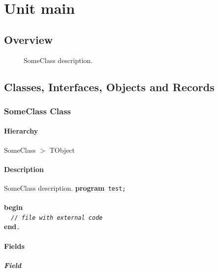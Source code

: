 \documentclass{report}
\begin{document}
\newlength{\tmplength}
\chapter{Unit main}
\section{Overview}
\begin{description}
\item[\texttt{\begin{ttfamily}SomeClass\end{ttfamily} Class}]SomeClass description.
\end{description}
\section{Classes, Interfaces, Objects and Records}
\subsection*{SomeClass Class}
\subsubsection*{\large{\textbf{Hierarchy}}\normalsize\hspace{1ex}\hfill}
SomeClass {$>$} TObject
\subsubsection*{\large{\textbf{Description}}\normalsize\hspace{1ex}\hfill}
SomeClass description. \texttt{}\textbf{program}\texttt{~test;\\\nopagebreak[3]
\\\nopagebreak[3]
}\textbf{begin}\texttt{\\\nopagebreak[3]
~~\textit{//~file~with~external~code}\\\nopagebreak[3]
}\textbf{end}\texttt{.\\
}\subsubsection*{\large{\textbf{Fields}}\normalsize\hspace{1ex}\hfill}
\paragraph*{Field}\hspace*{\fill}
\end{document}
